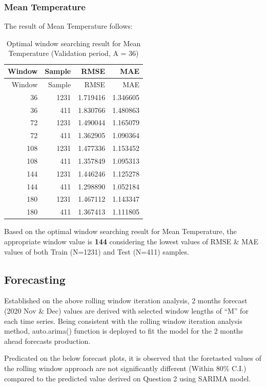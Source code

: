 \documentclass[
  11pt,
]{article}
\begin{document}
\hypertarget{mean-temperature}{%
\subsubsection{Mean Temperature}\label{mean-temperature}}

The result of Mean Temperature follows:

\begin{longtable}[]{@{}rrrr@{}}
\caption{Optimal window searching result for Mean Temperature
(Validation period, A = 36)}\tabularnewline
\toprule
Window & Sample & RMSE & MAE\tabularnewline
\midrule
\endfirsthead
\toprule
Window & Sample & RMSE & MAE\tabularnewline
\midrule
\endhead
36 & 1231 & 1.719416 & 1.346605\tabularnewline
36 & 411 & 1.830766 & 1.480863\tabularnewline
72 & 1231 & 1.490044 & 1.165079\tabularnewline
72 & 411 & 1.362905 & 1.090364\tabularnewline
108 & 1231 & 1.477336 & 1.153452\tabularnewline
108 & 411 & 1.357849 & 1.095313\tabularnewline
144 & 1231 & 1.446246 & 1.125278\tabularnewline
144 & 411 & 1.298890 & 1.052184\tabularnewline
180 & 1231 & 1.467112 & 1.143347\tabularnewline
180 & 411 & 1.367413 & 1.111805\tabularnewline
\bottomrule
\end{longtable}

Based on the optimal window searching result for Mean Temperature, the
appropriate window value is \textbf{144} considering the lowest values
of RMSE \& MAE values of both Train (N=1231) and Test (N=411) samples.

\hypertarget{forecasting}{%
\subsection{Forecasting}\label{forecasting}}

Established on the above rolling window iteration analysis, 2 months
forecast (2020 Nov \& Dec) values are derived with selected window
lengths of ``M'' for each time series. Being consistent with the rolling
window iteration analysis method, auto.arima() function is deployed to
fit the model for the 2 months ahead forecasts production.

Predicated on the below forecast plots, it is observed that the
foretasted values of the rolling window approach are not significantly
different (Within 80\% C.I.) compared to the predicted value derived on
Question 2 using SARIMA model.

\newpage
\end{document}
